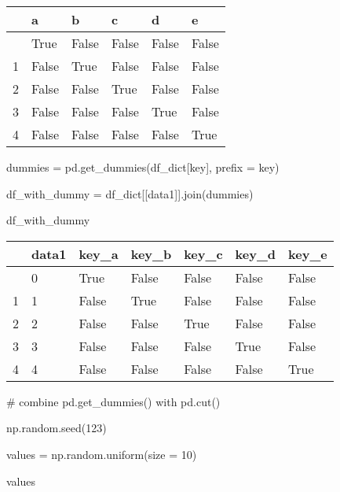 \documentclass[
  letterpaper,
  DIV=11,
  numbers=noendperiod]{scrreprt}
\newenvironment{Shaded}{\begin{snugshade}}{\end{snugshade}}
\newcommand{\CommentTok}[1]{\textcolor[rgb]{0.37,0.37,0.37}{#1}}
\newcommand{\DecValTok}[1]{\textcolor[rgb]{0.68,0.00,0.00}{#1}}
\newcommand{\NormalTok}[1]{\textcolor[rgb]{0.00,0.23,0.31}{#1}}
\newcommand{\OperatorTok}[1]{\textcolor[rgb]{0.37,0.37,0.37}{#1}}
\newcommand{\StringTok}[1]{\textcolor[rgb]{0.13,0.47,0.30}{#1}}
\begin{document}
\begin{longtable}[]{@{}llllll@{}}
\toprule\noalign{}
& a & b & c & d & e \\
\midrule\noalign{}
\endhead
\bottomrule\noalign{}
\endlastfoot
0 & True & False & False & False & False \\
1 & False & True & False & False & False \\
2 & False & False & True & False & False \\
3 & False & False & False & True & False \\
4 & False & False & False & False & True \\
\end{longtable}

\begin{Shaded}
\begin{Highlighting}[]
\NormalTok{dummies }\OperatorTok{=}\NormalTok{ pd.get\_dummies(df\_dict[}\StringTok{\textquotesingle{}key\textquotesingle{}}\NormalTok{], prefix }\OperatorTok{=} \StringTok{\textquotesingle{}key\textquotesingle{}}\NormalTok{)}

\NormalTok{df\_with\_dummy }\OperatorTok{=}\NormalTok{ df\_dict[[}\StringTok{\textquotesingle{}data1\textquotesingle{}}\NormalTok{]].join(dummies)}

\NormalTok{df\_with\_dummy}
\end{Highlighting}
\end{Shaded}

\begin{longtable}[]{@{}lllllll@{}}
\toprule\noalign{}
& data1 & key\_a & key\_b & key\_c & key\_d & key\_e \\
\midrule\noalign{}
\endhead
\bottomrule\noalign{}
\endlastfoot
0 & 0 & True & False & False & False & False \\
1 & 1 & False & True & False & False & False \\
2 & 2 & False & False & True & False & False \\
3 & 3 & False & False & False & True & False \\
4 & 4 & False & False & False & False & True \\
\end{longtable}

\begin{Shaded}
\begin{Highlighting}[]
\CommentTok{\# combine pd.get\_dummies() with pd.cut()}

\NormalTok{np.random.seed(}\DecValTok{123}\NormalTok{)}

\NormalTok{values }\OperatorTok{=}\NormalTok{ np.random.uniform(size }\OperatorTok{=} \DecValTok{10}\NormalTok{)}

\NormalTok{values}
\end{Highlighting}
\end{Shaded}
\end{document}
